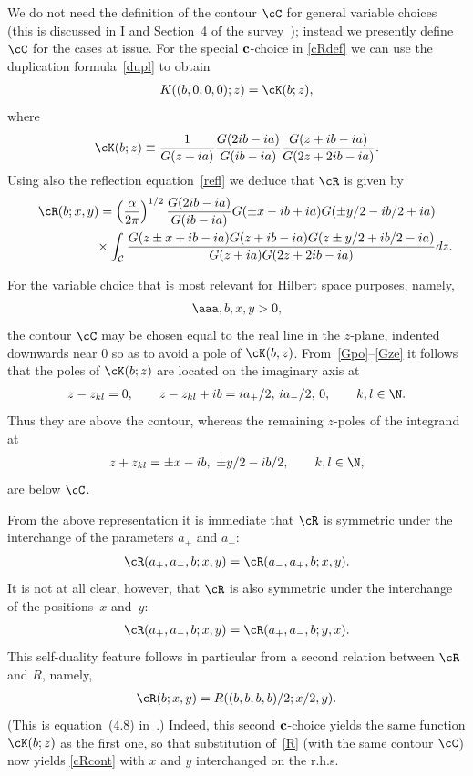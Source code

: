 \documentclass[pdftex]{sigma}
\numberwithin{equation}{section}
\begin{document}
We do not need the def\/inition of the contour $\cC$ for general variable choices (this is discussed in I and Section~4 of the survey~\cite{Rsurv}); instead we presently def\/ine $\cC$ for the cases at issue. For the special ${\bf c}$-choice in \eqref{cRdef} we can use the duplication formula~\eqref{dupl} to obtain
\begin{gather}
K((b,0,0,0);z)=\cK(b;z),
\end{gather}
where
\begin{gather}
\cK(b;z)\equiv \frac{1}{G(z+ia)}\frac{G(2ib-ia)}{G(ib-ia)}\frac{G(z+ib-ia)}{G(2z+2ib-ia)}.
\end{gather}
Using also the ref\/lection equation~\eqref{refl}
we deduce that $\cR$ is given by
\begin{gather}
\cR(b;x,y)     =     \left(\frac{\alpha}{2\pi}\right)^{1/2}\frac{G(2ib-ia)}{G(ib-ia)}G(\pm x-ib+ia)G(\pm y/2-ib/2+ia)
\nonumber \\
\phantom{\cR(b;x,y)     =}{}\times \int_{\cal
C}\frac{G(z\pm x+ib-ia)G(z+ib-ia)G(z\pm y/2+ib/2-ia)}{G(z+ia)G(2z+2ib-ia)}dz.\label{cRcont}
\end{gather}

For the variable choice that is most relevant for Hilbert space purposes, namely,
\begin{gather}\label{Hpar}
\aaa,b,x,y>0,
\end{gather}
the contour $\cC$ may be chosen equal to the real line in the $z$-plane, indented downwards near 0 so as to avoid a pole of $\cK(b;z)$. From~\eqref{Gpo}--\eqref{Gze} it follows that the poles of $\cK(b;z)$ are located on the imaginary axis at
\begin{gather}\label{Kpoles}
z-z_{kl}=0,\qquad z-z_{kl}+ib=ia_{+}/2, \, ia_{-}/2, \, 0,\qquad k,l\in\N.
\end{gather}
Thus they are above the contour, whereas the remaining $z$-poles of the integrand at
\begin{gather}
z+z_{kl}=\pm x-ib,\  \pm y/2-ib/2,\qquad  k,l\in\N,
\end{gather}
are below $\cC$.

From the above representation it is immediate that $\cR$ is symmetric under the interchange of the parameters $a_{+}$ and $a_{-}$:
\begin{gather}\label{Rmodinv}
\cR(a_{+},a_{-},b;x,y)=\cR(a_{-},a_{+},b;x,y).
\end{gather}
It is not at all clear, however, that $\cR$ is also symmetric under the interchange of the positions~$x$ and~$y$:
\begin{gather}\label{sd}
\cR(a_{+},a_{-},b;x,y)=\cR(a_{+},a_{-},b;y,x).
\end{gather}
 This self-duality feature follows in particular from a second relation between $\cR$ and $R$, namely,
\begin{gather}\label{cR2}
\cR(b;x,y)=R((b,b,b,b)/2;x/2,y).
\end{gather}
(This is equation~(4.8) in~\cite{quad}.) Indeed, this second ${\bf c}$-choice yields the same function $\cK(b;z)$ as the f\/irst one, so that substitution of~\eqref{R} (with the same contour $\cC$) now yields \eqref{cRcont} with $x$ and $y$ interchanged on the r.h.s.
\end{document}
